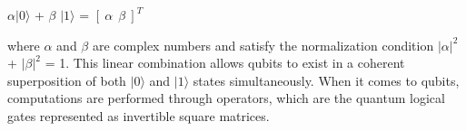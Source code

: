 \documentclass[12pt]{report}
\begin{document}
\begin{minipage}{1 \textwidth}
		
		\begin{center}
			$\alpha |0 \rangle$ + $\beta$ $|1 \rangle$ =  $[ \ \alpha \ \ \beta \ ]^T $
		\end{center}
		
		where $\alpha$ and $\beta$ are complex numbers and satisfy the normalization condition $|\alpha|^2$ + $|\beta|^2$ = 1. This linear combination allows qubits to exist in a coherent superposition of both $|0 \rangle$ and $ |1 \rangle$  states simultaneously.  \newline
		When it comes to qubits, computations are performed through operators, which are the quantum logical gates represented as invertible square matrices. \newline
		
		
		
		
		
	\end{minipage}
	
\end{document}
